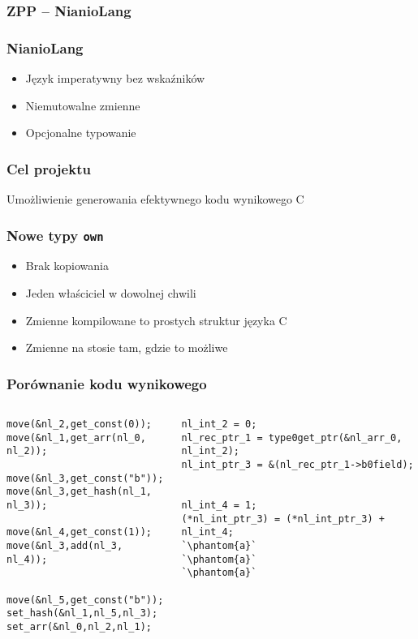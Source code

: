 \documentclass{beamer}
\begin{document}
	\begin{frame}
		\frametitle{ZPP -- NianioLang}
		
	\end{frame}
	
	\begin{frame}
		\frametitle{NianioLang}
		\begin{itemize}
		 \item Język imperatywny bez wskaźników
		 \item Niemutowalne zmienne
		 \item Opcjonalne typowanie
		\end{itemize}
	\end{frame}
	
	\begin{frame}
		\frametitle{Cel projektu}
		Umożliwienie generowania efektywnego kodu wynikowego C
	\end{frame}
	
	\begin{frame}
		\frametitle{Nowe typy \texttt{own}}
		\begin{itemize}
		 \item Brak kopiowania
		 \item Jeden właściciel w dowolnej chwili
		 \item Zmienne kompilowane to prostych struktur języka C
		 \item Zmienne na stosie tam, gdzie to możliwe
		\end{itemize}
	\end{frame}
	
	\begin{frame}[fragile]
		\frametitle{Porównanie kodu wynikowego}
		\center{\texttt{a[0]->b++}}
			\pause
		\begin{columns}
			\begin{column}{0.50\textwidth}
				\lstset{language=C}
				\begin{lstlisting}
move(&nl_2,get_const(0));
move(&nl_1,get_arr(nl_0, nl_2));

move(&nl_3,get_const("b"));
move(&nl_3,get_hash(nl_1, nl_3));

move(&nl_4,get_const(1));
move(&nl_3,add(nl_3, nl_4));


move(&nl_5,get_const("b"));
set_hash(&nl_1,nl_5,nl_3);
set_arr(&nl_0,nl_2,nl_1);
				\end{lstlisting}
			\end{column}
			\pause
			\begin{column}{0.50\textwidth}
				\lstset{language=C}
				\begin{lstlisting}
nl_int_2 = 0;
nl_rec_ptr_1 = type0get_ptr(&nl_arr_0, nl_int_2);
nl_int_ptr_3 = &(nl_rec_ptr_1->b0field);


nl_int_4 = 1;
(*nl_int_ptr_3) = (*nl_int_ptr_3) + nl_int_4;
`\phantom{a}`
`\phantom{a}`
`\phantom{a}`
				\end{lstlisting}
			\end{column}
		\end{columns}
	\end{frame}
	
\end{document}
